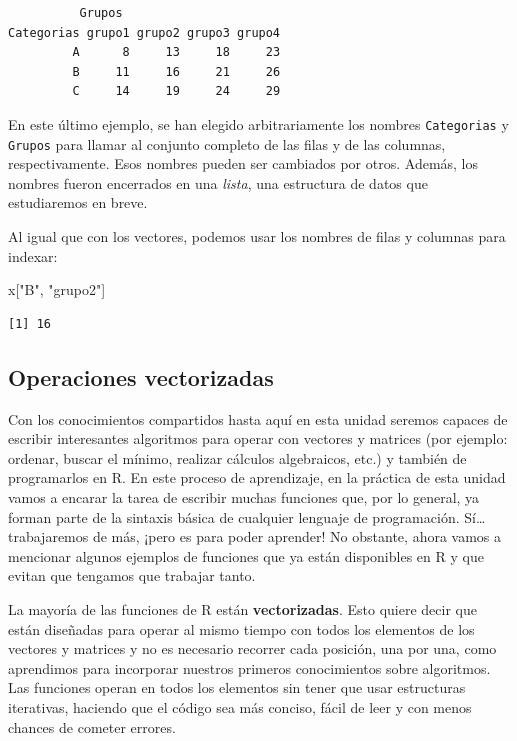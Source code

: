 \documentclass[
]{book}
\newenvironment{Shaded}{\begin{snugshade}}{\end{snugshade}}
\newcommand{\NormalTok}[1]{#1}
\newcommand{\StringTok}[1]{\textcolor[rgb]{0.31,0.60,0.02}{#1}}
\begin{document}
\begin{verbatim}
          Grupos
Categorias grupo1 grupo2 grupo3 grupo4
         A      8     13     18     23
         B     11     16     21     26
         C     14     19     24     29
\end{verbatim}

En este último ejemplo, se han elegido arbitrariamente los nombres \texttt{Categorias} y \texttt{Grupos} para llamar al conjunto completo de las filas y de las columnas, respectivamente. Esos nombres pueden ser cambiados por otros. Además, los nombres fueron encerrados en una \emph{lista}, una estructura de datos que estudiaremos en breve.

Al igual que con los vectores, podemos usar los nombres de filas y columnas para indexar:

\begin{Shaded}
\begin{Highlighting}[]
\NormalTok{x[}\StringTok{"B"}\NormalTok{, }\StringTok{"grupo2"}\NormalTok{]}
\end{Highlighting}
\end{Shaded}

\begin{verbatim}
[1] 16
\end{verbatim}

\hypertarget{operaciones-vectorizadas}{%
\subsection{Operaciones vectorizadas}\label{operaciones-vectorizadas}}

Con los conocimientos compartidos hasta aquí en esta unidad seremos capaces de escribir interesantes algoritmos para operar con vectores y matrices (por ejemplo: ordenar, buscar el mínimo, realizar cálculos algebraicos, etc.) y también de programarlos en R. En este proceso de aprendizaje, en la práctica de esta unidad vamos a encarar la tarea de escribir muchas funciones que, por lo general, ya forman parte de la sintaxis básica de cualquier lenguaje de programación. Sí\ldots{} trabajaremos de más, ¡pero es para poder aprender! No obstante, ahora vamos a mencionar algunos ejemplos de funciones que ya están disponibles en R y que evitan que tengamos que trabajar tanto.

La mayoría de las funciones de R están \textbf{vectorizadas}. Esto quiere decir que están diseñadas para operar al mismo tiempo con todos los elementos de los vectores y matrices y no es necesario recorrer cada posición, una por una, como aprendimos para incorporar nuestros primeros conocimientos sobre algoritmos. Las funciones operan en todos los elementos sin tener que usar estructuras iterativas, haciendo que el código sea más conciso, fácil de leer y con menos chances de cometer errores.
\end{document}
